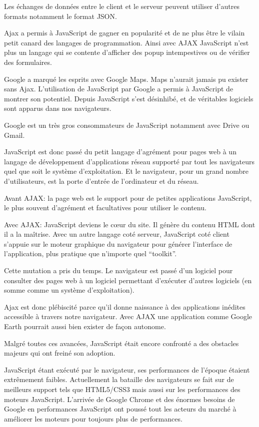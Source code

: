 Les échanges de données entre le client et le serveur peuvent utiliser d’autres formats notamment le format JSON.

Ajax a permis à JavaScript de gagner en popularité et de ne plus être le vilain petit canard des langages de programmation. Ainsi avec AJAX JavaScript n’est plus un langage qui se contente d'afficher des popup intempestives ou de vérifier des formulaires.

Google a marqué les esprits avec Google Maps. Maps n’aurait jamais pu exister sans Ajax. L’utilisation de JavaScript par Google a permis à JavaScript de montrer son potentiel. Depuis JavaScript s’est désinhibé, et de véritables logiciels sont apparus dans nos navigateurs.

Google est un très gros consommateurs de JavaScript notamment avec Drive ou Gmail.

JavaScript est donc passé du petit langage d’agrément pour pages web à un langage de développement d’applications réseau supporté par tout les navigateurs quel que soit le système d’exploitation. Et le navigateur, pour un grand nombre d’utilisateurs, est la porte d’entrée de l’ordinateur et du réseau.

Avant AJAX: la page web est le support pour de petites applications JavaScript, le plus souvent d’agrément et facultatives pour utiliser le contenu.

Avec AJAX: JavaScript deviens le cœur du site. Il génère du contenu HTML dont il a la maîtrise. Avec un autre langage coté serveur, JavaScript coté client s’appuie sur le moteur graphique du navigateur pour générer l’interface de l’application, plus pratique que n’importe quel “toolkit”.

Cette mutation a pris du temps. Le navigateur est passé d’un logiciel pour consulter des pages web à un logiciel permettant d’exécuter d’autres logiciels (en somme comme un système d’exploitation).

Ajax est donc plébiscité parce qu’il donne naissance à des applications inédites accessible à travers notre navigateur. Avec AJAX une application comme Google Earth pourrait aussi bien exister de façon autonome.

Malgré toutes ces avancées, JavaScript était encore confronté a des obstacles majeurs qui ont freiné son adoption.

JavaScript étant exécuté par le navigateur, ses performances de l’époque étaient extrêmement faibles. Actuellement la bataille des navigateurs se fait sur de meilleurs support tels que HTML5/CSS3 mais aussi sur les performances des moteurs JavaScript. L’arrivée de Google Chrome et des énormes besoins de Google en performances JavaScript ont poussé tout les acteurs du marché à améliorer les moteurs pour toujours plus de performances.

